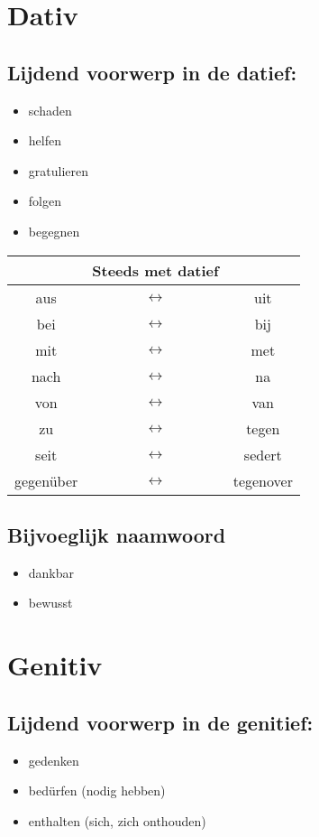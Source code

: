 \documentclass[main.tex]{subfiles}
\begin{document}
\section{Dativ}
\subsection{Lijdend voorwerp in de datief:}
\begin{itemize}
\item schaden
\item helfen
\item gratulieren
\item folgen
\item begegnen
\end{itemize}

\begin{tabular}{ccc}
 & Steeds met datief &  \\ 
\hline
aus & $\leftrightarrow$ & uit \\ 
bei & $\leftrightarrow$ & bij \\ 
mit & $\leftrightarrow$ & met \\ 
nach & $\leftrightarrow$ & na \\ 
von & $\leftrightarrow$ & van \\ 
zu & $\leftrightarrow$ & tegen \\ 
seit & $\leftrightarrow$ & sedert \\ 
gegenüber & $\leftrightarrow$ & tegenover \\ 
\end{tabular} 

\subsection{Bijvoeglijk naamwoord}

\begin{itemize}
\item dankbar
\item bewusst
\end{itemize}

\section{Genitiv}
\subsection{Lijdend voorwerp in de genitief:}
\begin{itemize}
\item gedenken
\item bedürfen (nodig hebben)
\item enthalten (sich, zich onthouden)
\end{itemize}
\end{document}
